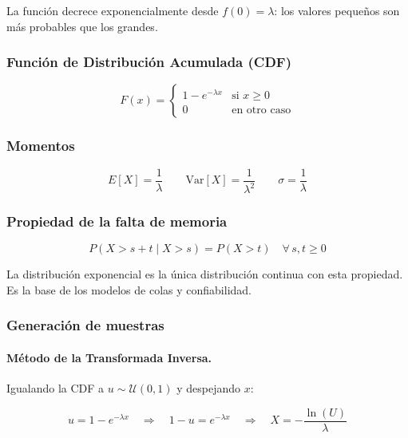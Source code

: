 La función decrece exponencialmente desde $f(0) = \lambda$: los valores pequeños son más
probables que los grandes.

\subsubsection{Función de Distribución Acumulada (CDF)}

\begin{equation}
F(x) =
\begin{cases}
1 - e^{-\lambda x} & \text{si } x \geq 0 \\[4pt]
0 & \text{en otro caso}
\end{cases}
\end{equation}

\subsubsection{Momentos}

\begin{equation}
E[X] = \frac{1}{\lambda} \qquad
\text{Var}[X] = \frac{1}{\lambda^2} \qquad
\sigma = \frac{1}{\lambda}
\end{equation}

\subsubsection{Propiedad de la falta de memoria}

\begin{equation}
P(X > s + t \mid X > s) = P(X > t) \quad \forall\, s, t \geq 0
\end{equation}

La distribución exponencial es la única distribución continua con esta propiedad. Es la base
de los modelos de colas y confiabilidad.

\subsubsection{Generación de muestras}

\paragraph{Método de la Transformada Inversa.}
Igualando la CDF a $u \sim \mathcal{U}(0,1)$ y despejando $x$:

\begin{equation}
u = 1 - e^{-\lambda x}
\quad \Longrightarrow \quad
1 - u = e^{-\lambda x}
\quad \Longrightarrow \quad
\boxed{X = -\frac{\ln(U)}{\lambda}}
\end{equation}

